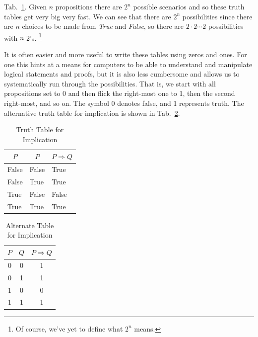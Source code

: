         Tab.~\ref{tab:Truth_Table_Implication}. Given $n$ propositions there are
        $2^{n}$ possible scenarios and so these truth tables get very big very
        fast. We can see that there are $2^{n}$ possibilities since there are
        $n$ choices to be made from \textit{True} and \textit{False}, so there
        are $2\cdot{2}\cdots{2}$ possibilities with $n$ 2's.%
        \footnote{Of course, we've yet to define what $2^{n}$ means.}
        \par\hfill\par
        It is often easier and more useful to write these tables using zeros and
        ones. For one this hints at a means for computers to be able to
        understand and manipulate logical statements and proofs, but it is also
        less cumbersome and allows us to systematically run through the
        possibilities. That is, we start with all propositions set to 0 and then
        flick the right-most one to 1, then the second right-most, and so on.
        The symbol 0 denotes false, and 1 represents truth. The alternative
        truth table for implication is shown in
        Tab.~\ref{tab:Alternate_Truth_Table_Implication}.
        \par
        \begin{minipage}[b]{0.49\textwidth}
            \centering
            \begin{table}[H]
                \centering
                \captionsetup{type=table}
                \begin{tabular}{l|l|l}
                    \multicolumn{1}{c|}{$P$}&\multicolumn{1}{c|}{$P$}&
                    \multicolumn{1}{c}{$P\Rightarrow{Q}$}\\
                    \hline
                    False&False&True\\
                    False&True&True\\
                    True&False&False\\
                    True&True&True
                \end{tabular}
                \caption{Truth Table for Implication}
                \label{tab:Truth_Table_Implication}
            \end{table}
        \end{minipage}\hfill
        \begin{minipage}[b]{0.49\textwidth}
            \centering
            \begin{table}[H]
                \centering
                \captionsetup{type=table}
                \begin{tabular}{c|c|c}
                    $P$&$Q$&$P\Rightarrow{Q}$\\
                    \hline
                    0&0&1\\
                    0&1&1\\
                    1&0&0\\
                    1&1&1
                \end{tabular}
                \caption{Alternate Table for Implication}
                \label{tab:Alternate_Truth_Table_Implication}
            \end{table}
        \end{minipage}
